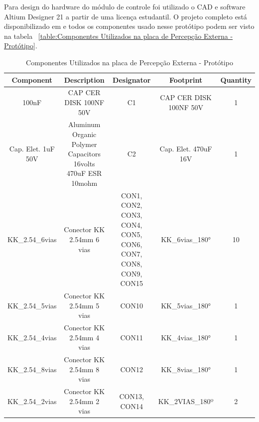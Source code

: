 \documentclass[../poliXuniversity_hospital_-USP-report.tex]{subfiles}
\begin{document}
Para design do hardware do módulo de controle foi utilizado o CAD e software Altium Designer 21 \cite{altium21} a partir de uma licença estudantil. O projeto completo está disponibilizado em \cite{github_modulos} e todos os componentes usado nesse protótipo podem ser visto na tabela ~\ref{table:Componentes Utilizados na placa de Percepção Externa - Protótipo}.

\begin{table}[!ht]
\caption{Componentes Utilizados na placa de Percepção Externa - Protótipo}
\centering
\begin{adjustbox}{width=\columnwidth,center}
\begin{tabular}{|c|c|c|c|c|}
\hline
Component                     & Description                                                    & Designator                                                    & Footprint                   & Quantity \\ \hline
100nF                       & CAP CER DISK 100NF   50V                                       & C1                                                            & CAP CER DISK 100NF   50V    & 1        \\ \hline
Cap. Elet. 1uF   50V        & Aluminum Organic   Polymer Capacitors 16volts 470uF ESR 10mohm & C2                                                            & Cap. Elet. 470uF 16V        & 1        \\ \hline
KK\_2.54\_6vias             & Conector KK 2.54mm 6   vias                                    & CON1, CON2, CON3,   CON4, CON5, CON6, CON7, CON8, CON9, CON15 & KK\_6vias\_180°             & 10       \\ \hline
KK\_2.54\_5vias             & Conector KK 2.54mm 5   vias                                    & CON10                                                         & KK\_5vias\_180°             & 1        \\ \hline
KK\_2.54\_4vias             & Conector KK 2.54mm 4   vias                                    & CON11                                                         & KK\_4vias\_180°             & 1        \\ \hline
KK\_2.54\_8vias             & Conector KK 2.54mm 8   vias                                    & CON12                                                         & KK\_8vias\_180°             & 1        \\ \hline
KK\_2.54\_2vias             & Conector KK 2.54mm 2   vias                                    & CON13, CON14                                                  & KK\_2VIAS\_180º             & 2        \\ \hline

\end{tabular}
\end{adjustbox}
\end{table}
\end{document}
